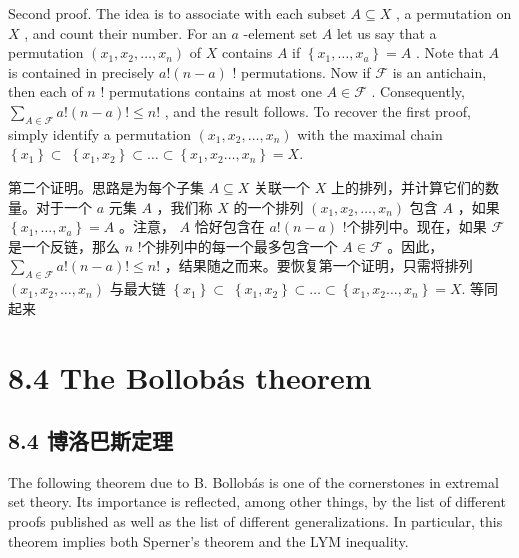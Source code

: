 \documentclass[10pt]{article}
\begin{document}
Second proof. The idea is to associate with each subset \(A \subseteq  X\) , a permutation on \(X\) , and count their number. For an \(a\) -element set \(A\) let us say that a permutation \(\left( {{x}_{1},{x}_{2},\ldots ,{x}_{n}}\right)\) of \(X\) contains \(A\) if \(\left\{  {{x}_{1},\ldots ,{x}_{a}}\right\}   = A\) . Note that \(A\) is contained in precisely \(a!\left( {n - a}\right)\) ! permutations. Now if \(\mathcal{F}\) is an antichain, then each of \(n\) ! permutations contains at most one \(A \in  \mathcal{F}\) . Consequently, \(\mathop{\sum }\limits_{{A \in  \mathcal{F}}}a!\left( {n - a}\right) ! \leq  n!\) , and the result follows. To recover the first proof, simply identify a permutation \(\left( {{x}_{1},{x}_{2},\ldots ,{x}_{n}}\right)\) with the maximal chain \(\left\{  {x}_{1}\right\}   \subset \; \left\{  {{x}_{1},{x}_{2}}\right\}   \subset  \ldots  \subset  \left\{  {{x}_{1},{x}_{2}\ldots ,{x}_{n}}\right\}   = X.\)

\begin{tcolorbox}\relax
第二个证明。思路是为每个子集 \(A \subseteq  X\) 关联一个 \(X\) 上的排列，并计算它们的数量。对于一个 \(a\) 元集 \(A\) ，我们称 \(X\) 的一个排列 \(\left( {{x}_{1},{x}_{2},\ldots ,{x}_{n}}\right)\) 包含 \(A\) ，如果 \(\left\{  {{x}_{1},\ldots ,{x}_{a}}\right\}   = A\) 。注意， \(A\) 恰好包含在 \(a!\left( {n - a}\right)\) !个排列中。现在，如果 \(\mathcal{F}\) 是一个反链，那么 \(n\) !个排列中的每一个最多包含一个 \(A \in  \mathcal{F}\) 。因此， \(\mathop{\sum }\limits_{{A \in  \mathcal{F}}}a!\left( {n - a}\right) ! \leq  n!\) ，结果随之而来。要恢复第一个证明，只需将排列 \(\left( {{x}_{1},{x}_{2},\ldots ,{x}_{n}}\right)\) 与最大链 \(\left\{  {x}_{1}\right\}   \subset \; \left\{  {{x}_{1},{x}_{2}}\right\}   \subset  \ldots  \subset  \left\{  {{x}_{1},{x}_{2}\ldots ,{x}_{n}}\right\}   = X.\) 等同起来
\end{tcolorbox}

\section*{8.4 The Bollobás theorem}

\begin{tcolorbox}\relax
\section*{8.4 博洛巴斯定理}
\end{tcolorbox}

The following theorem due to B. Bollobás is one of the cornerstones in extremal set theory. Its importance is reflected, among other things, by the list of different proofs published as well as the list of different generalizations. In particular, this theorem implies both Sperner's theorem and the LYM inequality.
\end{document}
